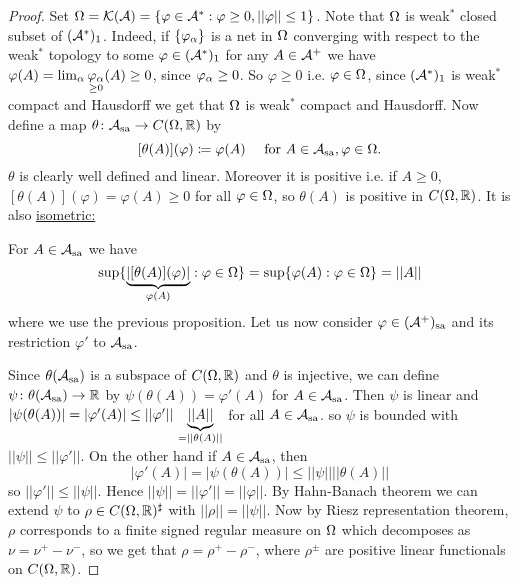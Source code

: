 \documentclass[10pt,english,a4paper]{article}
\theoremstyle{definition}
\def\Assa{\As_{\text{sa}}}
\def\sa{\text{sa}}
\def\vphi{\varphi}
\begin{document}
\begin{proof}

    Set $\Om = \Ks(\As) = \{\vphi \in \As^* : \vphi\geq 0, ||\vphi||\leq 1\}$.
    Note that $\Omega$ is weak$^*$ closed subset of $(\mathcal{A}^*)_{1}$. Indeed, if 
    $\{\vphi_{\al}\}$ is a net in $\Omega$ converging with respect to
    the weak$^*$ topology to some $\vphi \in (\As^*)_1$
    for any $A \in \mathcal{A}^+$ we have $\vphi(A) = \lim_{\al} \underset{\geq
    0}{\vphi_{\al}} (A)\geq 0$, since $\vphi_{\al}\geq 0$.
    So $\vphi\geq 0$ i.e. $\vphi \in \Om$, since $(\mathcal{A}^*)_1$ is weak$^*$ compact
    and Hausdorff we get that $\Omega$ is weak$^*$ compact and Hausdorff. Now
    define a map $\theta \colon \Assa \to C(\Om,\R)$ by 
    \[ [\theta(A)](\vphi)\coloneqq \vphi(A) \quad \text{ for }A\in \Assa, \vphi\in \Om.\]
    $\theta$ is clearly well defined and linear. Moreover it is positive i.e.
    if $A\geq 0$, $[\theta(A)](\vphi) = \vphi(A)\geq 0$ for all $\vphi \in
    \Om$, so $\theta (A)$ is positive in $C(\Omega,\mathbb{R})$. It is also \ul{isometric:}
    
    For $A \in \Assa$ we have 
    \[ \sup\{ \ub{|[\theta(A)](\vphi)|}_{\vphi(A)} : \vphi \in \Om \} 
    =\sup\{ \vphi(A) : \vphi \in \Om \} = ||A|| 
    \] 
    where we use the previous proposition. 
    Let us now consider $\vphi \in (\As^+)_{\sa}$ and its restriction 
    $\vphi'$ to $\Assa$.
    
    
    Since $\theta(\Assa)$ is a subspace of $C(\Omega,\mathbb{R})$ and $\theta$ is injective,
    we can define $\psi\colon \theta(\Assa) \to \R$ by 
$\psi(\theta(A)) = \vphi'(A)$ for $A\in \Assa$. Then $\psi$ is linear and
$|\psi(\theta(A))| = |\vphi'(A)| \leq ||\vphi'||\,\ub{||A||}_{=||\theta(A)||} $
for all $A \in \Assa$.
so $\psi$ is bounded with $||\psi|| \leq||\vphi'||$. On the other hand if $A
\in \Assa$, then
\[ |\vphi'(A)| = |\psi(\theta(A))| \leq ||\psi|| ||\theta(A)||\]
so $||\vphi'||\leq ||\psi||$. Hence 
$||\psi|| = ||\vphi'|| = ||\vphi||$. By Hahn-Banach theorem we can extend
$\psi$ to $\rho \in C(\Omega,\mathbb{R})^{\sharp}$ with $||\rho || = ||\psi||$.
Now by Riesz representation theorem, $\rho$ corresponds to a finite 
signed regular measure on $\Omega$ which decomposes as $\nu =\nu^+-\nu^-$,
so we get that $\rho =\rho^+ - \rho^-$, where $\rho^{\pm}$ are positive linear functionals
on $C(\Omega,\mathbb{R})$. 


\end{proof}
\end{document}
